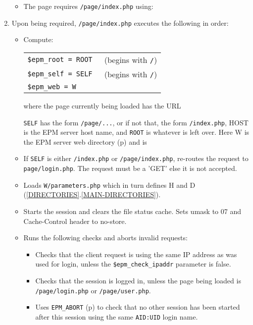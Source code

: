 \documentclass[12pt]{article}
\newcommand{\EOL}{\penalty \exhyphenpenalty}
\newcommand{\pagref}[1]{p\pageref{#1}}
\newcommand{\sref}[2]{(\ref{#1}.\ref{#2})}
\begin{document}
\begin{enumerate}
\begin{itemize}
\item The page requires {\tt /page/index.php} using:

      \hspace*{0.2in}{\tt require \_\_DIR\_\_ . '/index.php'}
      
\end{itemize}

\item \label{INDEX-ACTIONS}
      Upon being required, {\tt /page/index.php} executes the
      following in order:
\begin{itemize}
\item Compute:

      \hspace*{0.2in}\begin{tabular}{ll}
		\tt \$epm\_root = ROOT & (begins with {\tt /}) \\
		\tt \$epm\_self = SELF & (begins with {\tt /}) \\
		\tt \$epm\_web = W \\
		\end{tabular}

       where the page currently being loaded has the URL

       \hspace*{0.2in}{\tt http://HOST/ROOT/SELF}

       {\tt SELF} has the form {\tt /page/...}, or if
       not that, the form {\tt /index.php}, HOST is the
       EPM server host name, and {\tt ROOT} is whatever
       is left over.  Here W is the EPM server web directory
       (\pagref{W-DIRECTORY}) and is

       \hspace*{0.2in}{\tt \$\_SERVER['DOCUMENT\_ROOT'] . ROOT}

\item If {\tt SELF} is either {\tt /index.php} or {\tt /page/index.php},
      re-routes the request to {\tt page/\EOL login.php}.  The
      request must be a 'GET' else it is not accepted.

\item Loads {\tt W/parameters.php} which in turn defines H and D
      \sref{DIRECTORIES}{MAIN-DIRECTORIES}.

\item Starts the session and clears the file status cache.
Sets umask to 07 and Cache-Control header to no-store.

\item Runs the following checks and aborts invalid requests:
\begin{itemize}
\item Checks that the client request is using the same IP
address as was used for login, unless the {\tt \$epm\_check\_ipaddr}
parameter is false.
\item Checks that the session is logged in, unless the page being
loaded is {\tt /page/\EOL login.php} or {\tt /page/user.php}.
\item Uses {\tt EPM\_ABORT} (\pagref{EPM_ABORT}) to check that
no other session has been started after this session using the
same {\tt AID:UID} login name.
\end{itemize}


\end{itemize}
\end{enumerate}
\end{document}
